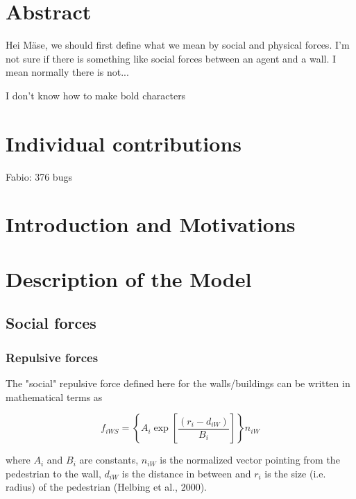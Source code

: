 \documentclass[11pt]{article}
\begin{document}
\newpage




\section{Abstract}

Hei M\"ase, we should first define what we mean by social and physical forces. I'm not sure if there is something like social forces between an agent and a wall. I mean normally there is not...

I don't know how to make bold characters

\section{Individual contributions}

Fabio: 376 bugs

\section{Introduction and Motivations}

\section{Description of the Model}

\subsection{Social forces}
\subsubsection{Repulsive forces}

The "social" repulsive force defined here for the walls/buildings can be written in mathematical terms as

\begin{equation}
	{f_{iWS}} = \left\{ {{A_i}\exp \left[ {\frac{{\left( {{r_i} - {d_{iW}}} \right)}}{{{B_i}}}} \right]} \right\}{n_{iW}}
	\label{eq:fiWS}
\end{equation}

where $A_i$ and $B_i$ are constants, $n_{iW}$ is the normalized vector pointing from the pedestrian to the wall, $d_{iW}$ is the distance in between and $r_i$ is the size (i.e. radius) of the pedestrian (Helbing et al., 2000).
\end{document}
